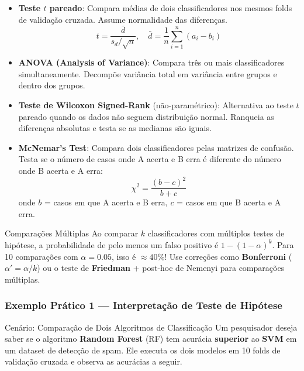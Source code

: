\documentclass[12pt,a4paper]{article}
\begin{document}
\begin{itemize}
  \item \textbf{Teste $t$ pareado}: Compara médias de dois classificadores nos mesmos folds de validação cruzada. Assume normalidade das diferenças.
    \[
      t = \frac{\bar{d}}{s_d / \sqrt{n}}, \quad \bar{d} = \frac{1}{n}\sum_{i=1}^{n}(a_i - b_i)
    \]
  \item \textbf{ANOVA (Analysis of Variance)}: Compara três ou mais classificadores simultaneamente. Decompõe variância total em variância entre grupos e dentro dos grupos.
  \item \textbf{Teste de Wilcoxon Signed-Rank} (não-paramétrico): Alternativa ao teste $t$ pareado quando os dados não seguem distribuição normal. Ranqueia as diferenças absolutas e testa se as medianas são iguais.
  \item \textbf{McNemar's Test}: Compara dois classificadores pelas matrizes de confusão. Testa se o número de casos onde A acerta e B erra é diferente do número onde B acerta e A erra:
    \[
      \chi^2 = \frac{(b - c)^2}{b + c}
    \]
    onde $b$ = casos em que A acerta e B erra, $c$ = casos em que B acerta e A erra.
\end{itemize}

\begin{atencaobox}{Comparações Múltiplas}
Ao comparar $k$ classificadores com múltiplos testes de hipótese, a probabilidade de pelo menos um falso positivo é $1-(1-\alpha)^k$. Para 10 comparações com $\alpha=0.05$, isso é $\approx 40\%$! Use correções como \textbf{Bonferroni} ($\alpha' = \alpha/k$) ou o teste de \textbf{Friedman} + post-hoc de Nemenyi para comparações múltiplas.
\end{atencaobox}

\subsubsection*{Exemplo Prático 1 --- Interpretação de Teste de Hipótese}

\begin{exemplobox}{Cenário: Comparação de Dois Algoritmos de Classificação}
Um pesquisador deseja saber se o algoritmo \textbf{Random Forest} (RF) tem acurácia \textbf{superior} ao \textbf{SVM} em um dataset de detecção de spam. Ele executa os dois modelos em 10 folds de validação cruzada e observa as acurácias a seguir.
\end{exemplobox}
\end{document}
